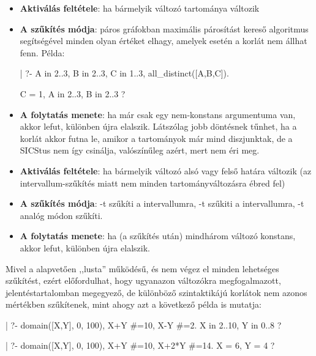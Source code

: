 \begin{itemize}
\item {\bf Aktiválás feltétele}: ha bármelyik változó tartománya változik
\item {\bf A szűkítés módja}: páros gráfokban maximális párosítást kereső
algoritmus segítségével minden olyan értéket elhagy, amelyek esetén a korlát nem
állhat fenn. Példa:
\begin{prologcode}
| ?- A in 2..3, B in 2..3, C in 1..3,
     all_distinct([A,B,C]).
\end{prologcode}
\begin{prologcode}
                 C = 1, A in 2..3, B in 2..3 ?
\end{prologcode}
\item {\bf A folytatás menete}: ha már csak egy nem-konstans argumentuma van,
akkor lefut, különben újra elalszik. Látszólag jobb döntésnek tűnhet, ha a korlát
akkor futna le, amikor a tartományok már mind diszjunktak, de a SICStus nem így
csinálja, valószínűleg azért, mert nem éri meg.
\end{itemize}

\begin{itemize}
\item {\bf Aktiválás feltétele}: ha bármelyik változó alsó vagy felső határa változik (az
intervallum-szűkítés miatt nem minden tartományváltozásra ébred fel)
\item {\bf A szűkítés módja}: -t szűkíti a  intervallumra, -t szűkiti a  intervallumra, -t analóg módon szűkíti.
\item {\bf A folytatás menete}: ha (a szűkítés után) mindhárom változó konstans, akkor lefut,
különben újra elalszik.
\end{itemize}

Mivel a \clpfd alapvetően ,,lusta'' működésű, és nem végez el minden lehetséges
szűkítést, ezért előfordulhat, hogy ugyanazon változókra megfogalmazott, jelentéstartalomban
megegyező, de különböző szintaktikájú korlátok nem azonos mértékben szűkítenek,
mint ahogy azt a következő példa is mutatja:

\begin{prologcode}
| ?- domain([X,Y], 0, 100), X+Y #=10, X-Y #=2.
                X in 2..10, Y in 0..8 ?

| ?- domain([X,Y], 0, 100), X+Y #=10, X+2*Y #=14.
                X = 6, Y = 4 ?
\end{prologcode}

